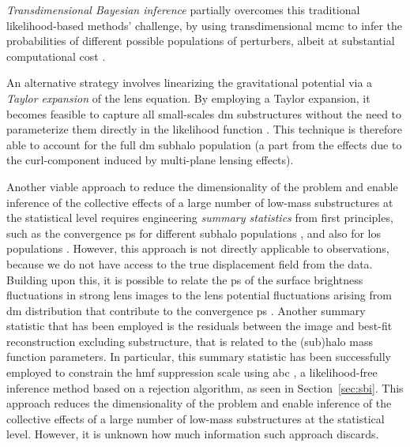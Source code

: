 \emph{Transdimensional Bayesian inference} partially overcomes this traditional likelihood-based methods' challenge, by using transdimensional \gls*{mcmc} to infer the probabilities of different possible populations of perturbers, albeit at substantial computational cost \cite{Brewer:2015yya,Daylan:2017kfh}. 

An alternative strategy involves linearizing the gravitational potential via a \emph{Taylor expansion} of the lens equation. By employing a Taylor expansion, it becomes feasible to capture all small-scales \gls*{dm} substructures without the need to parameterize them directly in the likelihood function \cite{Vegetti:2008eg, Koopmans:2005nr, Galan:2022ifd}. This technique is therefore able to account for the full \gls*{dm} subhalo population (a part from the effects due to the curl-component induced by multi-plane lensing effects).

Another viable approach to reduce the dimensionality of the problem and enable inference of the collective effects of a large number of low-mass substructures at the statistical level requires engineering \emph{summary statistics} from first principles, such as the convergence \gls*{ps} for different subhalo populations \cite{DiazRivero:2017xkd, DiazRivero:2018aa, Brennan:2018jhq}, and also for \gls*{los} populations \cite{CaganSengul:2020nat}. However, this approach is not directly applicable to observations, because we do not have access to the true displacement field from the data. Building upon this, it is possible to relate the \gls*{ps} of the surface brightness fluctuations in strong lens images to the lens potential fluctuations arising from \gls*{dm} distribution that contribute to the convergence \gls*{ps} \cite{Chatterjee:2017orx, Cyr-Racine:2019aa, Bayer:2018vhy}. Another summary statistic that has been employed is the residuals between the image and best-fit reconstruction excluding substructure, that is related to the (sub)halo mass function parameters. In particular, this summary statistic has been successfully employed to constrain the \gls*{hmf} suppression scale using \gls*{abc} \cite{Birrer:2017rpp, He:2020rkj}, a likelihood-free inference method based on a rejection algorithm, as seen in Section~\ref{sec:sbi}. This approach reduces the dimensionality of the problem and enable inference of the collective effects of a large number of low-mass substructures at the statistical level. However, it is unknown how much information such approach discards. 

